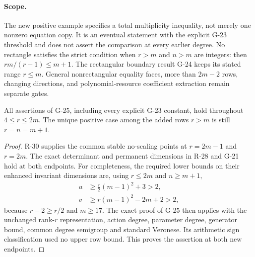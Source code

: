 \paragraph{Scope.}
The new positive example specifies a total multiplicity inequality,
not merely one nonzero equation copy. It is an eventual statement
with the explicit G-23 threshold and does not assert the comparison
at every earlier degree. No rectangle satisfies the strict
condition when $r>m$ and $n>m$ are integers: then
$rm/(r-1)\le m+1$. The rectangular boundary result G-24 keeps
its stated range $r\le m$. General nonrectangular equality
faces, more than $2m-2$ rows, changing directions, and
polynomial-resource coefficient extraction remain separate gates.


\begin{corollary}\label{G25:endpoints}
All assertions of G-25, including every explicit G-23 constant,
hold throughout $4\le r\le2m$. The unique positive case among
the added rows $r>m$ is still $r=n=m+1$.
\end{corollary}

\begin{proof}
R-30 supplies the common stable no-scaling points at
$r=2m-1$ and $r=2m$. The exact determinant and permanent
dimensions in R-28 and G-21 hold at both endpoints. For
completeness, the required lower bounds on their enhanced
invariant dimensions are, using $r\le2m$ and $n\ge m+1$,
\[
 \begin{aligned}
 u&\ge\frac r2(m-1)^2+3>2,\\
 v&\ge r(m-1)^2-2m+2>2,
 \end{aligned}
\]
because $r-2\ge r/2$ and $m\ge17$.
The exact proof of G-25 then applies with the unchanged
rank-$r$ representation, action degree, parameter degree,
generator bound, common degree semigroup and standard Veronese.
Its arithmetic sign classification used no upper row bound.
This proves the assertion at both new endpoints.
\end{proof}


